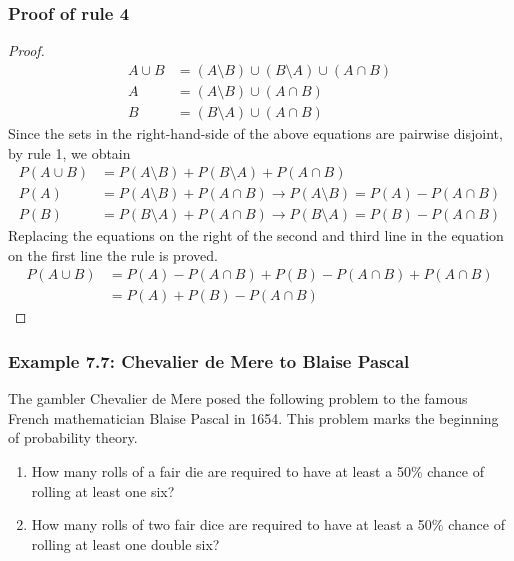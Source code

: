 \begin{frame}
    \frametitle{Proof of rule 4}
    \tiny
	\begin{proof}
		\begin{align*}
            A\cup B&=\left(A\setminus B\right)\cup\left(B\setminus A\right)\cup\left(A\cap B\right)\\
            A&=\left(A\setminus B\right)\cup \left(A\cap B\right)\\
            B&=\left(B\setminus A\right)\cup \left(A\cap B\right)
		\end{align*}
        Since the sets in the right-hand-side of the above equations are
        pairwise disjoint, by rule 1, we obtain
		\begin{align*}
            P\left(A\cup B\right)&=P\left(A\setminus B\right)+P\left(B\setminus A\right)+P\left(A\cap B\right)\\
            P\left(A\right)&=P\left(A\setminus B\right)+P\left(A\cap B\right)\rightarrow P\left(A\setminus B\right)=P\left(A\right)-P\left(A\cap B\right)\\
            P\left(B\right)&=P\left(B\setminus A\right)+P\left(A\cap B\right)\rightarrow P\left(B\setminus A\right)=P\left(B\right)-P\left(A\cap B\right)
		\end{align*}
        Replacing the equations on the right of the second and third line in
        the equation on the first line the rule is proved.
		\begin{align*}
            P\left(A\cup B\right)&=P\left(A\right)-P\left(A\cap B\right)+P\left(B\right)-P\left(A\cap B\right)+P\left(A\cap B\right)\\
                                 &=P\left(A\right)+P\left(B\right)-P\left(A\cap B\right)
		\end{align*}
	\end{proof}
    \normalsize
\end{frame}

\begin{frame}
    \frametitle{Example 7.7: Chevalier de Mere to Blaise Pascal}

    The gambler Chevalier de Mere posed the following problem to the famous
    French mathematician Blaise Pascal in 1654. This problem marks the beginning
    of probability theory.

    \begin{manualProbExample}{7.7}
        \begin{enumerate}[a]

            \item How many rolls of a fair die are required to have at least a
                50\% chance of rolling at least one six?

            \item How many rolls of two fair dice are required to have at
                least a 50\% chance of rolling at least one double six?

        \end{enumerate}
    \end{manualProbExample}

\end{frame}

